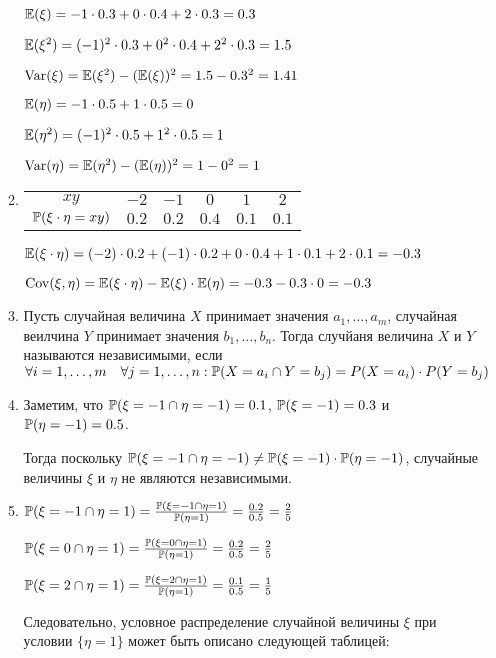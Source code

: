 \begin{enumerate}
\begin{enumerate}
$\E(\xi) = -1 \cdot 0.3 + 0 \cdot 0.4 + 2 \cdot 0.3 = 0.3$

$\E (\xi^2) = (-1)^2 \cdot 0.3 + 0^2 \cdot 0.4 + 2^2 \cdot 0.3 = 1.5$

$\Var(\xi) = \E(\xi^2) - (\E(\xi))^2 = 1.5 - 0.3^2 = 1.41$

$\E(\eta) = -1 \cdot 0.5 + 1 \cdot 0.5 = 0$

$\E(\eta^2) = (-1)^2 \cdot 0.5 + 1^2 \cdot 0.5 = 1$

$\Var(\eta) = \E(\eta^2)-(\E(\eta))^2 = 1 - 0^2 = 1$

\item
\begin{center}
\begin{tabular}{cccccc}
\toprule
$xy$ & $-2$ & $-1$ & $0$ & $1$ & $2$ \\
$\P(\xi \cdot \eta = xy)$ & $0.2$ & $0.2$ & $0.4$ & $0.1$ & $0.1$ \\ \bottomrule
\end{tabular}
\end{center}

$\E(\xi\cdot\eta) = (-2) \cdot 0.2 + (-1) \cdot 0.2 + 0 \cdot 0.4 + 1\cdot 0.1 + 2 \cdot 0.1 = -0.3$

$\Cov(\xi, \eta) = \E(\xi\cdot\eta) - \E(\xi)\cdot\E(\eta) = -0.3 - 0.3 \cdot 0 = -0.3$
\item Пусть случайная величина $X$ принимает значения $a_1, \ldots, a_m$, случайная веилчина $Y$ принимает значения $b_1, \ldots, b_n$. Тогда случйаня величина $X$ и $Y$ называются независимыми, если $\forall i=1, \ldots, m \quad \forall j=1, \ldots, n: \P(X = a_i \cap Y = b_j) = P(X = a_i) \cdot P(Y = b_j)$
\item Заметим, что $\P (\xi = -1 \cap \eta=-1)=0.1$, $\P(\xi=-1)=0.3$ и $\P(\eta=-1)=0.5$.

Тогда поскольку $\P (\xi = -1 \cap \eta=-1) \neq \P(\xi=-1) \cdot \P(\eta=-1)$, случайные величины $\xi$ и $\eta$ не являются независимыми.
\item $\P (\xi = -1 \cap \eta=1) = \frac{\P (\xi = -1 \cap \eta=1)}{\P(\eta=1)} = \frac{0.2}{0.5} = \frac{2}{5}$

$\P (\xi = 0 \cap \eta=1) = \frac{\P (\xi = 0 \cap \eta=1)}{\P(\eta=1)} = \frac{0.2}{0.5} = \frac{2}{5}$

$\P (\xi = 2 \cap \eta=1) = \frac{\P (\xi = 2 \cap \eta=1)}{\P(\eta=1)} = \frac{0.1}{0.5} = \frac{1}{5}$

Следовательно, условное распределение случайной величины $\xi$ при условии $\{\eta=1\}$ может быть описано следующей таблицей:


\end{enumerate}
\end{enumerate}
